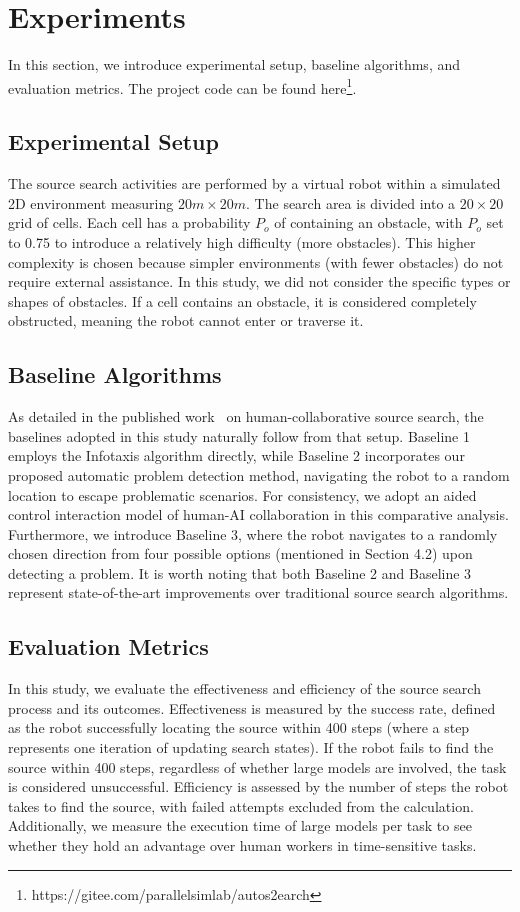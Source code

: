 \section{Experiments}\label{case}

In this section, we introduce experimental setup, baseline algorithms, and evaluation metrics. The project code can be found here\footnote[1]{https://gitee.com/parallelsimlab/autos2earch}.

\subsection{Experimental Setup}
The source search activities are performed by a virtual robot within a simulated 2D environment measuring $20m\times20m$. The search area is divided into a $20\times20$ grid of cells. Each cell has a probability $P_o$ of containing an obstacle, with $P_o$ set to 0.75 to introduce a relatively high difficulty (more obstacles). This higher complexity is chosen because simpler environments (with fewer obstacles) do not require external assistance. In this study, we did not consider the specific types or shapes of obstacles. If a cell contains an obstacle, it is considered completely obstructed, meaning the robot cannot enter or traverse it.

\subsection{Baseline Algorithms}
As detailed in the published work~\cite{zhao2023leveraging} on human-collaborative source search, the baselines adopted in this study naturally follow from that setup. Baseline 1 employs the Infotaxis algorithm directly, while Baseline 2 incorporates our proposed automatic problem detection method, navigating the robot to a random location to escape problematic scenarios. For consistency, we adopt an aided control interaction model of human-AI collaboration in this comparative analysis.
Furthermore, we introduce Baseline 3, where the robot navigates to a randomly chosen direction from four possible options (mentioned in Section 4.2) upon detecting a problem. It is worth noting that both Baseline 2 and Baseline 3 represent state-of-the-art improvements over traditional source search algorithms.

\subsection{Evaluation Metrics}
In this study, we evaluate the effectiveness and efficiency of the source search process and its outcomes. Effectiveness is measured by the success rate, defined as the robot successfully locating the source within 400 steps (where a step represents one iteration of updating search states). If the robot fails to find the source within 400 steps, regardless of whether large models are involved, the task is considered unsuccessful. Efficiency is assessed by the number of steps the robot takes to find the source, with failed attempts excluded from the calculation. Additionally, we measure the execution time of large models per task to see whether they hold an advantage over human workers in time-sensitive tasks.


